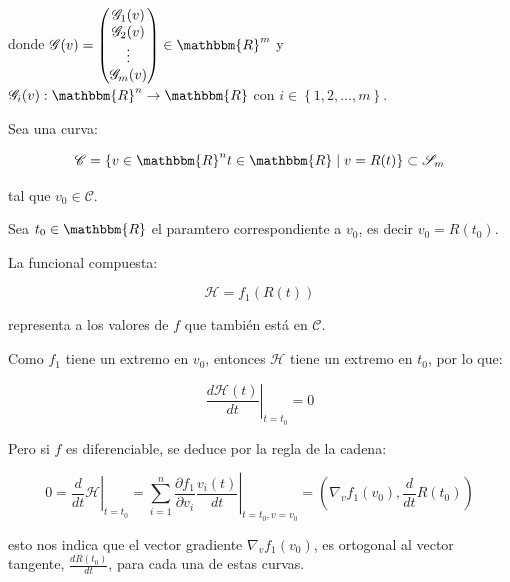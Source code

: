             donde $\mathscr{G}(v) = \begin{pmatrix} \mathscr{G}_1(v) \\ \mathscr{G}_2(v) \\ \vdots \\ \mathscr{G}_m(v) \end{pmatrix} \in \mathbbm{R}^m$
                y $\mathscr{G}_i(v):\mathbbm{R}^n \to \mathbbm{R}$
                con $i \in \left\{ 1,2,\dots,m \right\}$.

            Sea una curva:

            \begin{equation}
                \mathscr{C} = \left\{ v\in \mathbbm{R}^n t \in \mathbbm{R} \mid v = R(t) \right\} \subset \mathscr{S}_m
            \end{equation}

            tal que $v_0 \in \mathscr{C}$.

            Sea $t_0 \in \mathbbm{R}$ el paramtero correspondiente a $v_0$, es decir $v_0 = R(t_0)$.

            La funcional compuesta:

            \begin{equation}
                \mathscr{H} = f_1(R(t))
            \end{equation}

            representa a los valores de $f$  que también está en $\mathscr{C}$.

            Como $f_1$ tiene un extremo en $v_0$, entonces $\mathscr{H}$ tiene un extremo en $t_0$, por lo que:

            \begin{equation}
                \left. \frac{d \mathscr{H}(t)}{dt} \right|_{t=t_0} = 0
            \end{equation}

            Pero si $f$ es diferenciable, se deduce por la regla de la cadena:

            \begin{equation}
                0 = \left. \frac{d}{dt} \mathscr{H} \right|_{t=t_0} = \left. \sum_{i=1}^n \frac{\partial f_1}{\partial v_i} \frac{v_i(t)}{dt} \right|_{t=t_0, v=v_0} = \left( \nabla_v f_1(v_0), \frac{d}{dt} R(t_0) \right)
            \end{equation}

            esto nos indica que el vector gradiente $\nabla_v f_1(v_0)$, es ortogonal al vector tangente, $\frac{d R(t_0)}{dt}$, para cada una de estas curvas.

